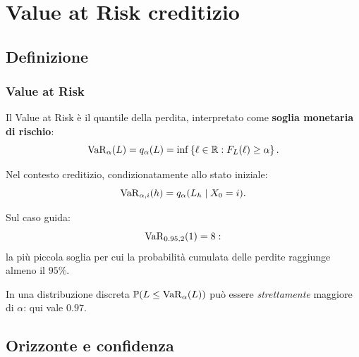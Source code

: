\section{Value at Risk creditizio}

\subsection{Definizione}%

\begin{frame}%
%

\frametitle{Value at Risk}%
%

%


Il Value at Risk \`{e} il quantile della perdita, interpretato come
\textbf{soglia monetaria di rischio}:
\[
\operatorname{VaR}_{\alpha}(L) = q_{\alpha}(L) = \inf\left\{  \ell\in\mathbb{R}: F_{L}(\ell
)\geq\alpha\right\}  .
\]


\medskip

\begin{stepitemize}
\item Nel contesto creditizio, condizionatamente allo stato iniziale:
\[
\operatorname{VaR}_{\alpha,i}(h) = q_{\alpha}(L_{h}\mid X_{0}=i).
\]


\item Sul caso guida:
\[
\operatorname{VaR}_{0.95,2}(1)=8:
\]
la pi\`{u} piccola soglia per cui la probabilit\`{a} cumulata delle perdite
raggiunge almeno il $95\%$.

\item In una distribuzione discreta $\mathbb{P}(L\leq\operatorname{VaR}_{\alpha}(L))$ pu\`{o}
essere \emph{strettamente} maggiore di $\alpha$: qui vale $0.97$.
\end{stepitemize}

%

\transboxout
\end{frame}%




\subsection{Orizzonte e confidenza}%

